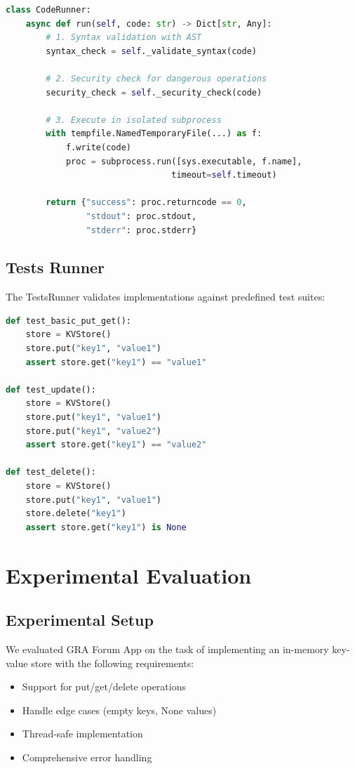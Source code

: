 \documentclass[12pt,a4paper]{article}
\begin{document}
\begin{lstlisting}[language=Python, caption=CodeRunner Implementation]
class CodeRunner:
    async def run(self, code: str) -> Dict[str, Any]:
        # 1. Syntax validation with AST
        syntax_check = self._validate_syntax(code)
        
        # 2. Security check for dangerous operations
        security_check = self._security_check(code)
        
        # 3. Execute in isolated subprocess
        with tempfile.NamedTemporaryFile(...) as f:
            f.write(code)
            proc = subprocess.run([sys.executable, f.name], 
                                 timeout=self.timeout)
        
        return {"success": proc.returncode == 0,
                "stdout": proc.stdout,
                "stderr": proc.stderr}
\end{lstlisting}

\subsection{Tests Runner}

The TestsRunner validates implementations against predefined test suites:

\begin{lstlisting}[language=Python, caption=KV Store Test Suite]
def test_basic_put_get():
    store = KVStore()
    store.put("key1", "value1")
    assert store.get("key1") == "value1"

def test_update():
    store = KVStore()
    store.put("key1", "value1")
    store.put("key1", "value2")
    assert store.get("key1") == "value2"

def test_delete():
    store = KVStore()
    store.put("key1", "value1")
    store.delete("key1")
    assert store.get("key1") is None
\end{lstlisting}

\section{Experimental Evaluation}

\subsection{Experimental Setup}

We evaluated GRA Forum App on the task of implementing an in-memory key-value store with the following requirements:
\begin{itemize}
    \item Support for put/get/delete operations
    \item Handle edge cases (empty keys, None values)
    \item Thread-safe implementation
    \item Comprehensive error handling
\end{itemize}
\end{document}
